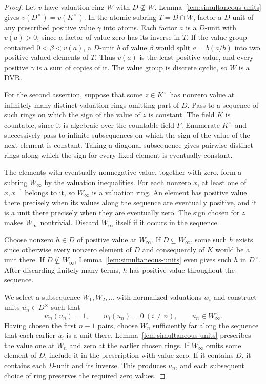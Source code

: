 \documentclass[11pt, letterpaper]{article}
\theoremstyle{definition}
\theoremstyle{remark}
\begin{document}
\begin{proof}
    Let $v$ have valuation ring $W$ with $D \nsubseteq W$.
    Lemma~\ref{lem:simultaneous-units} gives $v(D^{\times}) = v(K^{\times})$.
    In the atomic subring $T = D \cap W$, factor a $D$-unit of any prescribed positive value $\gamma$ into atoms.
    Each factor $a$ is a $D$-unit with $v(a) > 0$, since a factor of value zero has its inverse in $T$.
    If the value group contained $0 < \beta < v(a)$, a $D$-unit $b$ of value $\beta$ would split $a = b(a/b)$ into two positive-valued elements of $T$.
    Thus $v(a)$ is the least positive value, and every positive $\gamma$ is a sum of copies of it.
    The value group is discrete cyclic, so $W$ is a DVR.

    For the second assertion, suppose that some $z \in K^{\times}$ has nonzero value at infinitely many distinct valuation rings omitting part of $D$.
    Pass to a sequence of such rings on which the sign of the value of $z$ is constant.
    The field $K$ is countable, since it is algebraic over the countable field $F$.
    Enumerate $K^{\times}$ and successively pass to infinite subsequences on which the sign of the value of the next element is constant.
    Taking a diagonal subsequence gives pairwise distinct rings along which the sign for every fixed element is eventually constant.

    The elements with eventually nonnegative value, together with zero, form a subring $W_{\infty}$ by the valuation inequalities.
    For each nonzero $x$, at least one of $x, x^{-1}$ belongs to it, so $W_{\infty}$ is a valuation ring.
    An element has positive value there precisely when its values along the sequence are eventually positive, and it is a unit there precisely when they are eventually zero.
    The sign chosen for $z$ makes $W_{\infty}$ nontrivial.
    Discard $W_{\infty}$ itself if it occurs in the sequence.

    Choose nonzero $h \in D$ of positive value at $W_{\infty}$.
    If $D \subseteq W_{\infty}$, some such $h$ exists since otherwise every nonzero element of $D$ and consequently of $K$ would be a unit there.
    If $D \nsubseteq W_{\infty}$, Lemma~\ref{lem:simultaneous-units} even gives such $h$ in $D^{\times}$.
    After discarding finitely many terms, $h$ has positive value throughout the sequence.

    We select a subsequence $W_1, W_2, \dots$ with normalized valuations $w_i$ and construct units $u_n \in D^{\times}$ such that
    \[
        w_n(u_n) = 1, \qquad w_i(u_n) = 0 \ (i \ne n),
        \qquad u_n \in W_{\infty}^{\times}.
    \]
    Having chosen the first $n - 1$ pairs, choose $W_n$ sufficiently far along the sequence that each earlier $u_i$ is a unit there.
    Lemma~\ref{lem:simultaneous-units} prescribes the value one at $W_n$ and zero at the earlier chosen rings.
    If $W_{\infty}$ omits some element of $D$, include it in the prescription with value zero.
    If it contains $D$, it contains each $D$-unit and its inverse.
    This produces $u_n$, and each subsequent choice of ring preserves the required zero values.


\end{proof}
\end{document}
